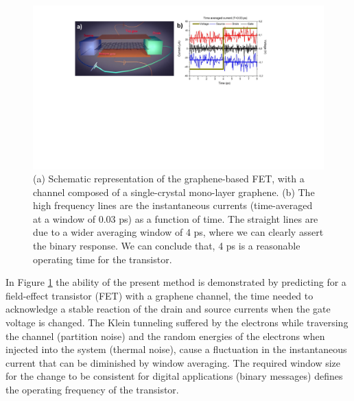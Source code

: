 \documentclass[11pt, a4paper]{article} %
\begin{document}
\begin{figure}[h!]
  \centering
  \hspace*{-0.3cm}
   \includegraphics[width=0.71\linewidth]{Figures/figurefinal.pdf}\vspace{-0.3cm}
   \caption{(a) Schematic representation of the graphene-based FET, with a channel composed of a single-crystal mono-layer graphene. (b) The high frequency lines are the instantaneous currents (time-averaged at a window of $0.03$ ps) as a function of time. The straight lines are due to a wider averaging window of 4 ps, where we can clearly assert the binary response. We can conclude that, 4 ps is a reasonable operating time for the transistor.}
  \label{fig:fig}
\end{figure}

In Figure \ref{fig:fig} the ability of the present method is demonstrated \cite{inject,Thz} by predicting for a field-effect transistor (FET) with a graphene channel, the time needed to acknowledge a stable reaction of the drain and source currents when the gate voltage is changed. The Klein tunneling suffered by the electrons while traversing the channel (partition noise) and the random energies of the electrons when injected into the system (thermal noise), cause a fluctuation in the instantaneous current that can be diminished by window averaging. The required window size for the change to be consistent for digital applications (binary messages) defines the operating frequency of the transistor.\vspace{-0.25cm}


\end{document}
